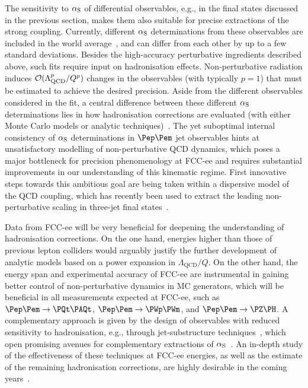 The sensitivity to $\alpha_{\rm S}$ of differential observables, e.g., in the final states discussed in the previous section, 
makes them also suitable for precise extractions of the strong coupling.
Currently, different $\alpha_{\rm S}$ determinations from these observables are included 
in the world average~\cite{Jones:2003yv,Dissertori:2007xa,Bethke:2009ehn,Becher:2008cf,Davison:2009wzs,
Dissertori:2009ik,Gehrmann:2010uax,Chien:2010kc,Abbate:2010xh,OPAL:2011aa,Gehrmann:2012sc,Abbate:2012jh,
Hoang:2015hka,Kardos:2018kqj,Dissertori:2009qa,Schieck:2012mp,Verbytskyi:2019zhh,Kardos:2020igb},
and can differ from each other by up to a few standard deviations.
Besides the high-accuracy perturbative ingredients described above,
such fits require input on hadronisation effects. 
Non-perturbative radiation induces ${\cal O}(\Lambda_\text{QCD}^p / Q^p)$ changes in the observables 
(with typically $p = 1$) that must be estimated to achieve the desired precision.
Aside from the different observables considered in the fit, 
a central difference between these different $\alpha_{\rm S}$ determinations 
lies in how hadronisation corrections are evaluated 
(with either Monte Carlo models or analytic techniques)~\cite{Korchemsky:1994is,Dokshitzer:1995qm,Dokshitzer:1997iz,Beneke:1997sr,Dokshitzer:1998pt,
Gardi:1999dq,Korchemsky:1999kt,Dasgupta:1999mb,Salam:2001bd,Gardi:2001di,Gardi:2003iv,Mateu:2012nk,Agarwal:2020uxi}. 
The yet suboptimal internal consistency of $\alpha_{\rm S}$ determinations in $\epem$ jet observables 
hints at unsatisfactory modelling of non-perturbative QCD dynamics, which poses a major bottleneck for precision phenomenology at FCC-ee 
and requires substantial improvements in our understanding of this kinematic regime. 
First innovative steps towards this ambitious goal are being taken within a dispersive model of the QCD coupling, 
which has recently been used to extract the leading non-perturbative scaling in three-jet 
final states~\cite{Luisoni:2020efy,Caola:2021kzt,Caola:2022vea,Nason:2023asn}.

Data from FCC-ee will be very beneficial for deepening the understanding of hadronisation corrections. 
On the one hand, energies higher than those of previous lepton colliders would arguably justify 
the further development of analytic models based on a power expansion in $\Lambda_\text{QCD}/Q$.
On the other hand, 
the energy span and experimental accuracy of FCC-ee are instrumental in gaining better control of non-perturbative dynamics in MC generators, 
which will be beneficial in all measurements expected at FCC-ee, 
such as $\epem \to \PQt\PAQt$, $\epem \to \PWp\PWm$, and $\epem \to \PZ \PH$.
A complementary approach is given by the design of observables with reduced sensitivity to hadronisation, 
e.g., through jet-substructure techniques~\cite{Frye:2016okc,Baron:2018nfz,Kardos:2020gty,Dasgupta:2022fim},
which open promising avenues for complementary extractions of $\alpha_{\rm S}$~\cite{Marzani:2019evv}.
An in-depth study of the effectiveness of these techniques at FCC-ee energies, 
as well as the estimate of the remaining hadronisation corrections, 
are highly desirable in the coming years~\cite{Marzani:2019evv,Hoang:2019ceu}.

